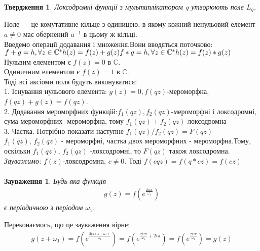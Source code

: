 \documentclass[12pt,a4paper]{article}
\begin{document}
\newtheorem{twerd}{Твердження}
\begin{twerd}
 Локсодромні функції з мультиплікатором \textit{q} утворюють поле $L_{q}$.
 \end{twerd} 
Поле — це комутативне кільце з одиницею, в якому кожний ненульовий елемент $a\neq 0$ має обернений $a^{-1}$ в цьому ж кільці.\\
Введемо операції додавання і множення.Вони вводяться поточково:\\
$f+g=h, \forall z \in \mathbb{C}^{*} h(z)=f(z)+g(z)\\
f*g=h, \forall z \in \mathbb{C}^{*} h(z)=f(z)*g(z)$\\
Нульвим елементом є $f(z)=0$ в $\mathbb{C}$.\\
Одиничним елементом є $f(z)=1$ в $\mathbb{C}$.\\
Тоді всі аксіоми поля будуть виконуватися:\\
1. Існування нульового елемента: $g(z)=0, f(qz)$-мероморфна, $f(qz)+g(z)=f(qz)$.\\
2. Додавання мероморфних функцій:$f_{1}(qz),f_{2}(qz)$-мероморфні і локсодромні, сума мероморфних- мероморфна, тому $f_{1}(qz)+f_{2}(qz)$-локсодромна \\
3. Частка. Потрібно показати наступне $f_{1}(qz)/f_{2}(qz)=F(qz)$\\
$f_{1}(qz)$, $f_{2}(qz)$ - мероморфні, частка двох мероморфних - мероморфна.Тому, оскільки $f_{1}(qz)$, $f_{2}(qz)$ -локсодромні, то $ F(qz)$ також локсодромна.\\
\emph{Зауважимо:} $f(z)$-локсодромна, $c \neq 0$. Тоді  $f(cqz)=f(q*cz)=f(cz)$
\[\begin{array}{l}
\end{array} \]

\newtheorem{zauv}{Зауваження}
\begin{zauv} 
Будь-яка функція 
\begin{equation}\label{eq1}
\begin{array}{l}
g(z)=f(e^{\frac{2iz\pi}{\omega_{1}}})
\end{array}
\end{equation}
є періодичною з періодом $\omega_{1}$.
\end{zauv}
Переконаємось, що це зауваження вірне: 
\[\begin{array}{l}
g(  z+\omega_{1}  ) = f(  e^{\frac{2i\pi (z+\omega_{1})}{\omega_{1}} }  ) =  f(  e^{\frac{2iz\pi }{ \omega_{1}}  +2i\pi } ) = f(  e^{\frac {2iz\pi}{\omega_{1}}} ) = g(z) 
\end{array}\]
\[\begin{array}{l}
\end{array} \]
\end{document}
